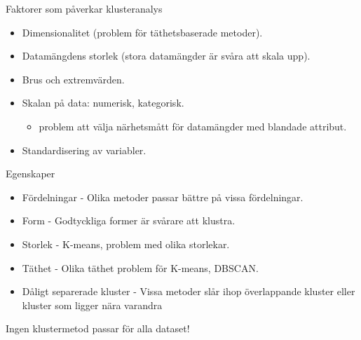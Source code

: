 \documentclass[10pt,english]{beamer}
\begin{document}
\begin{frame}{Faktorer som påverkar klusteranalys}
    \begin{itemize}
        \item Dimensionalitet (problem för täthetsbaserade metoder).
        \item Datamängdens storlek (stora datamängder är svåra att skala upp).
        \item Brus och extremvärden.
        \item Skalan på data: numerisk, kategorisk.
        \begin{itemize}
            \item problem att välja närhetsmått för datamängder med blandade attribut.
        \end{itemize}
        \item Standardisering av variabler.
    \end{itemize}
\end{frame}

\begin{frame}{Egenskaper}
    
\begin{itemize}
    \item Fördelningar - Olika metoder passar bättre på vissa fördelningar.
    \item Form - Godtyckliga former är svårare att klustra.
    \item Storlek - K-means, problem med olika storlekar.
    \item Täthet - Olika täthet problem för K-means, DBSCAN.
    \item Dåligt separerade kluster - Vissa metoder slår ihop överlappande kluster eller kluster som ligger nära varandra
\end{itemize}

\begin{redbox}
Ingen klustermetod passar för alla dataset!
\end{redbox}

\end{frame}
\end{document}
